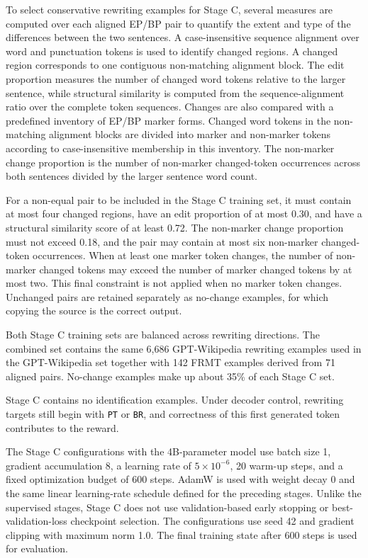 To select conservative rewriting examples for Stage C, several measures are
computed over each aligned EP/BP pair to quantify the extent and type of the
differences between the two sentences. A case-insensitive sequence alignment
over word and punctuation tokens is used to identify changed regions. A changed
region corresponds to one contiguous non-matching alignment block. The edit
proportion measures the number of changed word tokens relative to the larger
sentence, while structural similarity is computed from the sequence-alignment
ratio over the complete token sequences. Changes are also compared with a
predefined inventory of EP/BP marker forms. Changed word tokens in the
non-matching alignment blocks are divided into marker and non-marker tokens
according to case-insensitive membership in this inventory. The non-marker
change proportion is the number of non-marker changed-token occurrences across
both sentences divided by the larger sentence word count.

For a non-equal pair to be included in the Stage C training set, it must contain at
most four changed regions, have an edit proportion of at most 0.30, and have a
structural similarity score of at least 0.72. The non-marker change proportion
must not exceed 0.18, and the pair may contain at most six non-marker
changed-token occurrences. When at least one marker token changes, the number of
non-marker changed tokens may exceed the number of marker changed tokens by at
most two. This final constraint is not applied when no marker token changes.
Unchanged pairs are retained separately as no-change examples, for which copying
the source is the correct output.

Both Stage C training sets are balanced across rewriting directions. The
combined set contains the same 6,686 GPT-Wikipedia rewriting examples used in
the GPT-Wikipedia set together with 142 FRMT examples derived from 71 aligned
pairs. No-change examples make up about 35\% of each Stage C set.

Stage C contains no identification examples. Under decoder control, rewriting
targets still begin with \texttt{PT} or \texttt{BR}, and correctness of this
first generated token contributes to the reward.

The Stage C configurations with the 4B-parameter model use batch size 1,
gradient accumulation 8, a learning rate of \(5\times10^{-6}\), 20 warm-up
steps, and a fixed optimization budget of 600 steps. AdamW is used with weight decay 0 and the same linear learning-rate
schedule defined for the preceding stages. Unlike the supervised stages,
Stage C does not use validation-based early stopping or best-validation-loss
checkpoint selection. The configurations use seed 42 and gradient clipping with
maximum norm 1.0. The final training state after 600 steps is used for
evaluation.

